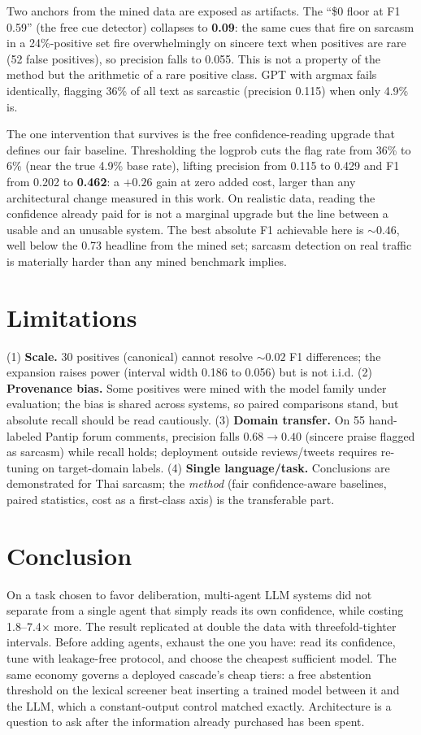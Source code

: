 \documentclass[10pt]{article}
\begin{document}
Two anchors from the mined data are exposed as artifacts. The ``\$0 floor at F1 0.59'' (the free cue
detector) collapses to \textbf{0.09}: the same cues that fire on sarcasm in a 24\%-positive set fire
overwhelmingly on sincere text when positives are rare (52 false positives), so precision falls to
0.055. This is not a property of the method but the arithmetic of a rare positive class. GPT with
argmax fails identically, flagging 36\% of all text as sarcastic (precision 0.115) when only 4.9\% is.

The one intervention that survives is the free confidence-reading upgrade that defines our fair
baseline. Thresholding the logprob cuts the flag rate from 36\% to 6\% (near the true 4.9\% base
rate), lifting precision from 0.115 to 0.429 and F1 from 0.202 to \textbf{0.462}: a $+0.26$ gain at
zero added cost, larger than any architectural change measured in this work. On realistic data,
reading the confidence already paid for is not a marginal upgrade but the line between a usable and
an unusable system. The best absolute F1 achievable here is ${\sim}0.46$, well below the 0.73
headline from the mined set; sarcasm detection on real traffic is materially harder than any mined
benchmark implies.

\section{Limitations}
(1) \textbf{Scale.} 30 positives (canonical) cannot resolve ${\sim}0.02$ F1 differences; the
expansion raises power (interval width 0.186 to 0.056) but is not i.i.d.
(2) \textbf{Provenance bias.} Some positives were mined with the model family under evaluation; the
bias is shared across systems, so paired comparisons stand, but absolute recall should be read
cautiously.
(3) \textbf{Domain transfer.} On 55 hand-labeled Pantip forum comments, precision falls
$0.68 \to 0.40$ (sincere praise flagged as sarcasm) while recall holds; deployment outside
reviews/tweets requires re-tuning on target-domain labels.
(4) \textbf{Single language/task.} Conclusions are demonstrated for Thai sarcasm; the \emph{method}
(fair confidence-aware baselines, paired statistics, cost as a first-class axis) is the
transferable part.

\section{Conclusion}
On a task chosen to favor deliberation, multi-agent LLM systems did not separate from a single agent
that simply reads its own confidence, while costing 1.8--7.4$\times$ more. The result replicated at
double the data with threefold-tighter intervals. Before adding agents, exhaust the one you have:
read its confidence, tune with leakage-free protocol, and choose the cheapest sufficient model. The
same economy governs a deployed cascade's cheap tiers: a free abstention threshold on the lexical
screener beat inserting a trained model between it and the LLM, which a constant-output control
matched exactly. Architecture is a question to ask after the information already purchased has been
spent.
\end{document}
